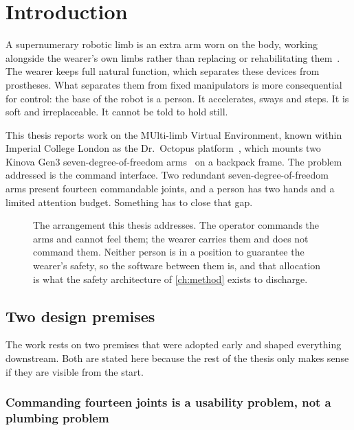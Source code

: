\chapter{Introduction}
\label{ch:intro}

A supernumerary robotic limb is an extra arm worn on the body, working
alongside the wearer's own limbs rather than replacing or rehabilitating
them~\cite{yang2021srlreview,prattichizzo2021augmentation}. The wearer keeps
full natural function, which separates these devices from prostheses. What
separates them from fixed manipulators is more consequential for control: the
base of the robot is a person. It accelerates, sways and steps. It is soft and
irreplaceable. It cannot be told to hold still.

This thesis reports work on the MUlti-limb Virtual Environment, known within
Imperial College London as the Dr.\ Octopus platform~\cite{muve}, which mounts
two Kinova Gen3 seven-degree-of-freedom arms~\cite{kinova2022gen3} on a
backpack frame. The problem addressed is the command interface. Two redundant
seven-degree-of-freedom arms present fourteen commandable joints, and a person
has two hands and a limited attention budget. Something has to close that gap.

\begin{figure}[htbp]
  \centering
  
  \caption[The two-person arrangement]{The arrangement this thesis addresses.
  The operator commands the arms and cannot feel them; the wearer carries them
  and does not command them. Neither person is in a position to guarantee the
  wearer's safety, so the software between them is, and that allocation is
  what the safety architecture of \cref{ch:method} exists to discharge.}
  \label{fig:overview}
\end{figure}

\section{Two design premises}

The work rests on two premises that were adopted early and shaped everything
downstream. Both are stated here because the rest of the thesis only makes
sense if they are visible from the start.

\subsection{Commanding fourteen joints is a usability problem, not a
plumbing problem}

